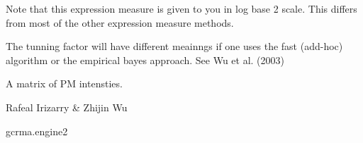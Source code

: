 \begin{Details}\relax
Note that this expression measure is given to you in log base 2
scale. This differs from most of the other expression measure
methods.

The tunning factor  will have different meainngs if one uses
the fast (add-hoc) algorithm or the empirical bayes approach. See Wu
et al. (2003)
\end{Details}
\begin{Value}
A matrix of PM intensties.
\end{Value}
\begin{Author}\relax
Rafeal Irizarry \& Zhijin Wu
\end{Author}
\begin{SeeAlso}\relax
gcrma.engine2
\end{SeeAlso}

